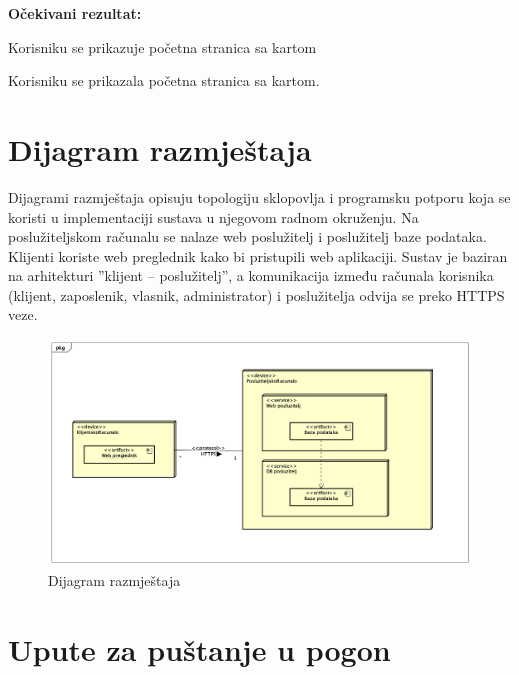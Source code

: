 			\noindent \textbf{Očekivani rezultat:}
				\begin{packed_enum}
				\item Korisniku se prikazuje početna stranica sa kartom
							
				
			\end{packed_enum}
			
		
				Korisniku se prikazala početna stranica sa kartom.		
			
			\eject 
		
		
		\section{Dijagram razmještaja}
			
			Dijagrami razmještaja opisuju topologiju sklopovlja i programsku potporu koja se koristi u implementaciji sustava u njegovom radnom okruženju. Na poslužiteljskom računalu se nalaze web poslužitelj i poslužitelj baze podataka. Klijenti koriste web preglednik kako bi pristupili web aplikaciji. Sustav je baziran na arhitekturi ”klijent – poslužitelj”, a komunikacija između računala korisnika (klijent, zaposlenik, vlasnik, administrator) i poslužitelja odvija se preko HTTPS veze.
			
			\begin{figure}[H]
					\includegraphics[scale=0.4]{figures/Deployment Diagram0.PNG}
					\centering
					\caption{Dijagram razmještaja}
					\label{fig:Dijagram razmještaja}
				\end{figure}
			\eject 
		
		\section{Upute za puštanje u pogon}
		
